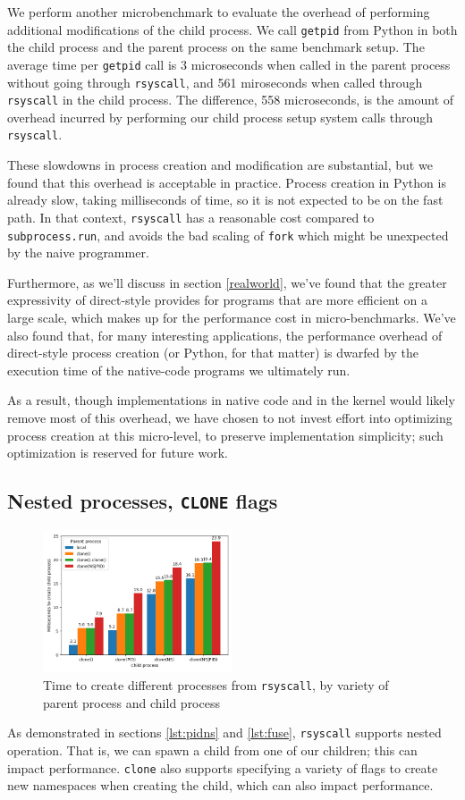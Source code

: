 \documentclass[letterpaper,twocolumn,10pt]{article}
\begin{document}
We perform another microbenchmark to evaluate the overhead of performing additional modifications of the child process.
We call \texttt{getpid} from Python
in both the child process and the parent process on the same benchmark setup.
The average time per \texttt{getpid} call is
3 microseconds when called in the parent process without going through \texttt{rsyscall},
and 561 miroseconds when called through \texttt{rsyscall} in the child process.
The difference, 558 microseconds,
is the amount of overhead incurred
by performing our child process setup system calls through \texttt{rsyscall}.

These slowdowns in process creation and modification are substantial,
but we found that this overhead is acceptable in practice.
Process creation in Python is already slow, taking milliseconds of time,
so it is not expected to be on the fast path.
In that context, \texttt{rsyscall} has a reasonable cost compared to \texttt{subprocess.run},
and avoids the bad scaling of \texttt{fork} which might be unexpected by the naive programmer.

Furthermore, as we'll discuss in section \ref{realworld},
we've found that the greater expressivity of direct-style
provides for programs that are more efficient on a large scale,
which makes up for the performance cost in micro-benchmarks.
We've also found that, for many interesting applications,
the performance overhead of direct-style process creation (or Python, for that matter)
is dwarfed by the execution time of the native-code programs we ultimately run.

As a result, though implementations in native code and in the kernel would likely remove most of this overhead,
we have chosen to not invest effort into optimizing process creation at this micro-level,
to preserve implementation simplicity;
such optimization is reserved for future work.
\subsection{Nested processes, \texttt{CLONE} flags}\label{clone_bench}
\begin{figure}
\centering
 \includegraphics[width=0.5\textwidth]{clone_bench}
 \caption{Time to create different processes from \texttt{rsyscall}, by variety of parent process and child process}
 \label{fig:clone_bench}
\end{figure}
As demonstrated in sections \ref{lst:pidns} and \ref{lst:fuse},
\texttt{rsyscall} supports nested operation.
That is, we can spawn a child from one of our children;
this can impact performance.
\texttt{clone} also supports specifying a variety of flags to create new namespaces when creating the child,
which can also impact performance.
\end{document}

